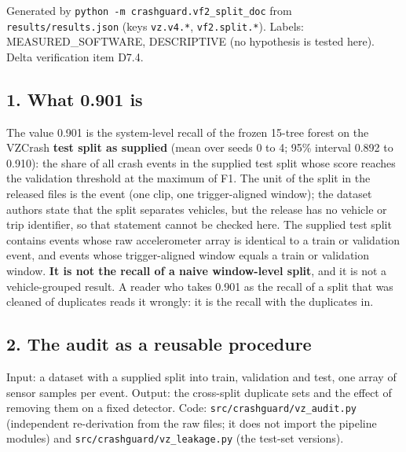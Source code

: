 


Generated by \texttt{python -m crashguard.vf2\_split\_doc} from \texttt{results/results.json} (keys \texttt{vz.v4.*}, \texttt{vf2.split.*}). Labels: MEASURED\_SOFTWARE, DESCRIPTIVE (no hypothesis is tested here). Delta verification item D7.4.

\subsection*{1. What 0.901 is}

The value 0.901 is the system-level recall of the frozen 15-tree forest on the VZCrash \textbf{test split as supplied} (mean over seeds 0 to 4; 95\% interval 0.892 to 0.910): the share of all crash events in the supplied test split whose score reaches the validation threshold at the maximum of F1. The unit of the split in the released files is the event (one clip, one trigger-aligned window); the dataset authors state that the split separates vehicles, but the release has no vehicle or trip identifier, so that statement cannot be checked here. The supplied test split contains events whose raw accelerometer array is identical to a train or validation event, and events whose trigger-aligned window equals a train or validation window. \textbf{It is not the recall of a naive window-level split}, and it is not a vehicle-grouped result. A reader who takes 0.901 as the recall of a split that was cleaned of duplicates reads it wrongly: it is the recall with the duplicates in.

\subsection*{2. The audit as a reusable procedure}

Input: a dataset with a supplied split into train, validation and test, one array of sensor samples per event. Output: the cross-split duplicate sets and the effect of removing them on a fixed detector. Code: \texttt{src/crashguard/vz\_audit.py} (independent re-derivation from the raw files; it does not import the pipeline modules) and \texttt{src/crashguard/vz\_leakage.py} (the test-set versions).

